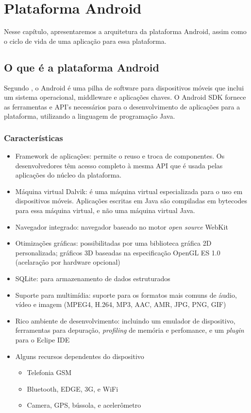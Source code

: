 
\chapter{Plataforma Android}
Nesse capítulo, apresentaremos a arquitetura da plataforma Android, assim como o
ciclo de vida de uma aplicação para essa plataforma.

\section{O que é a plataforma Android}
Segundo \cite{whatisandroid}, o Android é uma pilha de software para dispositivos
móveis que inclui um sistema operacional, middleware e aplicações chaves. O Android
SDK fornece as ferramentas e API's necessários para o desenvolvimento de aplicações
para a plataforma, utilizando a linguagem de programação Java.

\subsection{Características}
\begin{itemize}
    \item Framework de aplicações: permite o reuso e troca de componentes.
    Os desenvolvedores têm acesso completo à mesma API que é usada pelas aplicações
    do núcleo da plataforma.
    \item Máquina virtual Dalvik: é uma máquina virtual especializada para o uso em
    dispositivos móveis. Aplicações escritas em Java são compiladas em bytecodes para
    essa máquina virtual, e não uma máquina virtual Java.
    \item Navegador integrado: navegador baseado no motor {\it open source} WebKit
    \item Otimizações gráficas: possibilitadas por uma biblioteca gráfica 2D 
    personalizada; gráficos 3D baseadas na especificação OpenGL ES 1.0 (acelaração
    por hardware opcional)
    \item SQLite: para armazenamento de dados estruturados
    \item Suporte para multimídia: suporte para os formatos mais comuns de 
    áudio, vídeo e imagem (MPEG4, H.264, MP3, AAC, AMR, JPG, PNG, GIF)
    \item Rico ambiente de desenvolvimento: incluindo um emulador de dispositivo,
    ferramentas para depuração, {\it profiling} de memória e perfomance, e um {\it plugin}
    para o Eclipe IDE
    \item Alguns recursos dependentes do dispositivo
        \begin{itemize}
            \item Telefonia GSM 
            \item Bluetooth, EDGE, 3G, e WiFi
            \item Camera, GPS, bússola, e acelerômetro
        \end{itemize}
\end{itemize}

